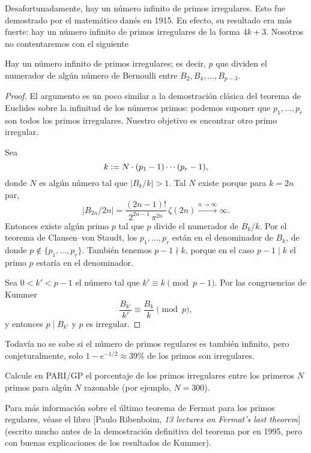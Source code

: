 \documentclass{article}
\begin{document}
\pagebreak

Desafortunadamente, hay un número infinito de primos irregulares. Esto fue demostrado por el matemático danés  en 1915. En efecto, su resultado era más fuerte: hay un número infinito de primos irregulares de la forma $4k + 3$. Nosotros no contentaremos con el siguiente

\begin{teorema*}
Hay un número infinito de primos irregulares; es decir, $p$ que dividen el numerador de algún número de Bernoulli entre $B_2, B_4, \ldots, B_{p-3}$.
\end{teorema*}

\begin{proof}
El argumento es un poco similar a la demostración clásica del teorema de Euclides sobre la infinitud de los números primos: podemos suponer que $p_1,\ldots,p_r$ son todos los primos irregulares. Nuestro objetivo es encontrar otro primo irregular.

Sea
$$k \mathrel{\mathop:}= N\cdot (p_1 - 1)\cdots (p_r - 1),$$
donde $N$ es algún número tal que $|B_k/k| > 1$. Tal $N$ existe porque para $k = 2n$ par,
$$|B_{2n}/2n| = \frac{(2n-1)!}{2^{2n-1}\,\pi^{2n}}\,\zeta (2n) \xrightarrow{n \to \infty} \infty.$$
Entonces existe algún primo $p$ tal que $p$ divide el numerador de $B_k/k$. Por el teorema de Clausen--von Staudt, los $p_1, \ldots, p_r$ están en el denominador de $B_k$, de donde $p \notin \{ p_1, \ldots, p_r \}$. También tenemos $p-1 \nmid k$, porque en el caso $p-1 \mid k$ el primo $p$ estaría en el denominador.

Sea $0 < k' < p-1$ el número tal que $k' \equiv k \pmod{p-1}$. Por las congruencias de Kummer
$$\frac{B_{k'}}{k'} \equiv \frac{B_k}{k} \pmod{p},$$
y entonces $p \mid B_{k'}$ y $p$ es irregular.
\end{proof}

Todavía no se sabe si el número de primos regulares es también infinito, pero conjeturalmente, solo $1 - e^{-1/2} \approx 39\%$ de los primos son irregulares.

\begin{ejercicio*}
Calcule en PARI/GP el porcentaje de los primos irregulares entre los primeros $N$ primos para algún $N$ razonable (por ejemplo, $N = 300$).
\end{ejercicio*}

Para más información sobre el último teorema de Fermat para los primos regulares, véase el libro [Paulo Ribenboim, \emph{13 lectures on Fermat’s last theorem}] (escrito mucho antes de la demostración definitiva del teorema por  en 1995, pero con buenas explicaciones de los resultados de Kummer).
\end{document}
